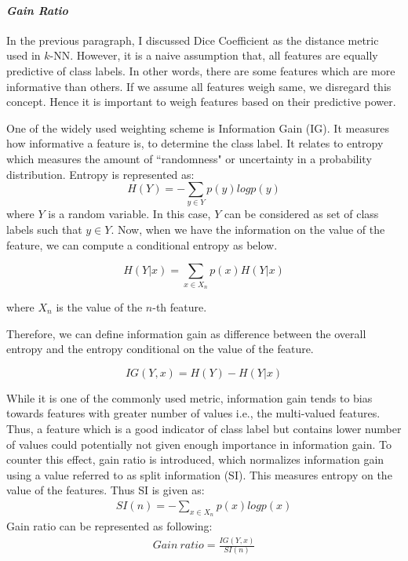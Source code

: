 \paragraph*{\textit{Gain Ratio}}

In the previous paragraph, I discussed Dice Coefficient as the distance metric used in $k$-NN. However, it is a naive assumption that, all features are equally predictive of class labels. In other words, there are some features which are more informative than others. If we assume all features weigh same, we disregard this concept. Hence it is important to weigh features based on their predictive power. 

One of the widely used weighting scheme is Information Gain (IG). It measures how informative a feature is, to determine the class label. It relates to entropy which measures the amount of ``randomness" or uncertainty in a probability distribution. Entropy is represented as:
\begin{equation}
   H(Y) = -\sum_{y \in Y}  p(y)logp(y) 
\end{equation}
where $Y$ is a random variable. In this case, $Y$ can be considered as set of class labels such that $y \in Y$. 
Now, when we have the information on the value of the feature, we can compute a conditional entropy as below. 

\begin{equation}
    H(Y|x) = \sum_{x \in X_n} p(x)H(Y|x)
\end{equation}

where $X_n$ is the value of the $n$-th feature.


Therefore, we can define information gain as difference between the overall entropy and the entropy conditional on the value of the feature. 

\begin{equation}
    IG(Y,x) = H(Y) - H(Y|x)
\end{equation}

While it is one of the commonly used metric, information gain tends to bias towards features with greater number of values i.e., the multi-valued features. Thus, a feature which is a good indicator of class label but contains lower number of values could potentially not given enough importance in information gain. To counter this effect, gain ratio is introduced, which normalizes information gain using a value referred to as split information (SI). This measures entropy on the value of the features. Thus SI is given as:
\begin{align}
    SI(n) = - \sum_{x \in X_n} p(x)logp(x)
\end{align}
Gain ratio can be represented as following:
\begin{align}
    Gain\ ratio = \frac{IG(Y,x)}{SI(n)}
\end{align}


